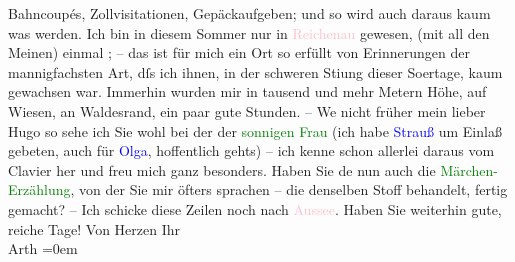                Bahncoupés, Zollvisitationen, Gepäckaufgeben; und so wird auch daraus kaum was
               werden. Ich bin in diesem Sommer {\pb}nur in \textcolor{pink}{Reichenau}{}\ledrightnote{\textcolor{pink}{Reichenau an der Rax}} gewesen, \label{K_L02327_3v}\label{K_L02327_3h} (mit
               all den Meinen) einmal \label{K_L02327_4v}\label{K_L02327_4h}; – das ist für mich ein Ort
               so erfüllt von Erinnerungen der mannigfachsten Art, dſs ich ihnen, in der schweren
                  Sti{\geminationm}ung dieser So{\geminationm}ertage, kaum gewachsen war. Immerhin wurden mir in tausend und mehr Metern Höhe,
               auf Wiesen, an Waldesrand, ein paar gute Stunden.\pend
           \pstart
           – We{\geminationn} nicht früher mein lieber Hugo so sehe ich Sie wohl
               bei der \label{K_L02327_5v}\label{K_L02327_5h} der \textcolor{green}{sonnigen Frau}{} (ich
               habe \textcolor{blue}{Strauß}{}\ledrightnote{\textcolor{blue}{Richard Strauss}} um Einlaß gebeten, auch für \textcolor{blue}{Olga}{}\ledrightnote{\textcolor{blue}{Olga Schnitzler}}, hoffentlich gehts) – ich kenne schon allerlei
               daraus vom Clavier her und freu mich ganz besonders. Haben Sie de{\geminationn} nun auch die \textcolor{green}{Märchen-Erzählung}{}, von der Sie mir öfters sprachen – die
               denselben Stoff behandelt, fertig gemacht? \pend
           \pstart
           – Ich schicke diese Zeilen noch nach \textcolor{pink}{Aussee}{}\ledrightnote{\textcolor{pink}{Bad Aussee}}. Haben
               Sie weiterhin gute, reiche Tage! \pend
           \pstart
           Von Herzen Ihr{\\[\baselineskip]}\spacefill\mbox{Arth}\pend
           \leftskip=0em{}\endnumbering{}  
      
